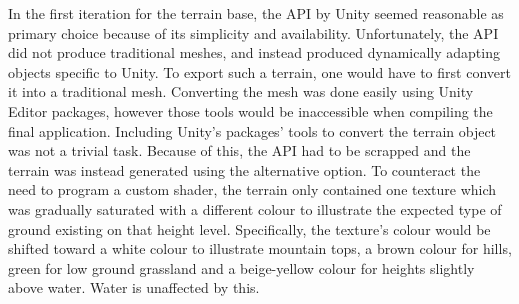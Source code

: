 In the first iteration for the terrain base, the API by Unity seemed reasonable as primary choice because of its simplicity and availability.
Unfortunately, the API did not produce traditional meshes, and instead produced dynamically adapting objects specific to Unity.
To export such a terrain, one would have to first convert it into a traditional mesh.
Converting the mesh was done easily using Unity Editor packages, however those tools would be inaccessible when compiling the final application.
Including Unity’s packages’ tools to convert the terrain object was not a trivial task.
Because of this, the API had to be scrapped and the terrain was instead generated using the alternative option.
To counteract the need to program a custom shader, the terrain only contained one texture which was gradually saturated with a different colour to illustrate the expected type of ground existing on that height level.
Specifically, the texture’s colour would be shifted toward a white colour to illustrate mountain tops, a brown colour for hills, green for low ground grassland and a beige-yellow colour for heights slightly above water.
Water is unaffected by this.

